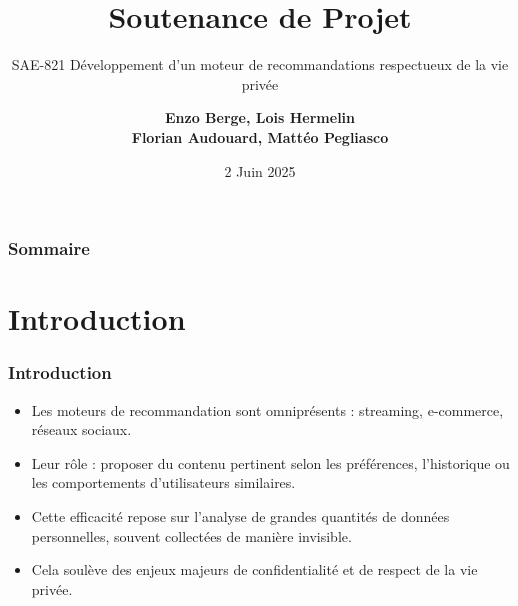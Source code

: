 \documentclass{beamer}
\title[Soutenance de Projet]{Soutenance de Projet}
\subtitle{SAE-821 Développement d’un
moteur de recommandations
respectueux de la vie privée}
\author{
    \textbf{Enzo Berge, Lois Hermelin}\\
    \textbf{Florian Audouard, Mattéo Pegliasco}
}
\institute{Université de Toulon, La Garde}
\date{2 Juin 2025}
\begin{document}
\begin{frame}
    \titlepage
\end{frame}

\begin{frame}
    \frametitle{Sommaire}
    \tableofcontents
\end{frame}

\section{Introduction}
\begin{frame}
    \frametitle{Introduction}

    \begin{itemize}
        \item Les moteurs de recommandation sont omniprésents : streaming, e-commerce, réseaux sociaux.
        
        \item Leur rôle : proposer du contenu pertinent selon les préférences, l’historique ou les comportements d’utilisateurs similaires.
        
        \item Cette efficacité repose sur l’analyse de grandes quantités de données personnelles, souvent collectées de manière invisible.

        \item Cela soulève des enjeux majeurs de confidentialité et de respect de la vie privée.
    \end{itemize}
\end{frame}




\end{document}
